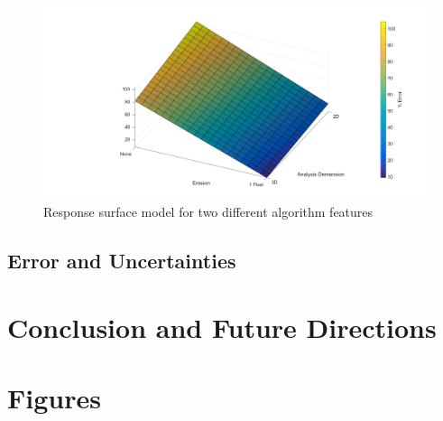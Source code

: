 \documentclass[12pt]{article}
\begin{document}
\begin{figure}[H]
	\centering
	\includegraphics[width=1\textwidth]{ResponseSurface.png}
	\caption{Response surface model for two different algorithm features}
	\label{fig:Surf}
\end{figure}
\subsection{Error and Uncertainties} 

\section{Conclusion and Future Directions} 

\section{Figures}





%
%
\end{document}
